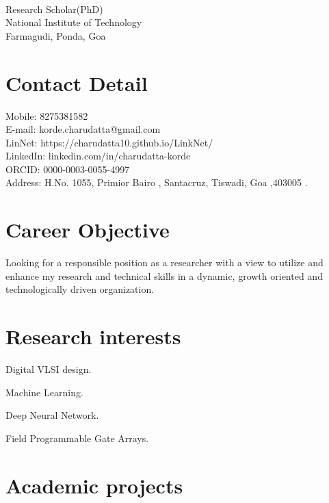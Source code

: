 \documentclass[fontsize=11pt]{tccv}
\begin{document}
\fancypage{\setlength{\fboxsep}{10pt}\fbox}{}
\\
Research Scholar(PhD)\\
National Institute of Technology\\ 
Farmagudi, Ponda, Goa\\ 
\section{Contact Detail}
\begin{flushleft} Mobile: 8275381582\\
E-mail: korde.charudatta@gmail.com\\
LinNet: https://charudatta10.github.io/LinkNet/\\
LinkedIn: linkedin.com/in/charudatta-korde\\
ORCID: 0000-0003-0055-4997\\
Address: H.No. 1055, Primior Bairo ,
Santacruz, Tiswadi, Goa ,403005 .
\end{flushleft}
\vspace{2em}

\section{Career Objective}
Looking for a responsible position as a researcher with a view to utilize and enhance my research and technical skills in a dynamic, growth oriented and technologically driven organization.
\vspace{2em}

\section{Research interests}
\begin{skills}
    \item {Digital VLSI design.}
    \item {Machine Learning.}
    \item {Deep Neural Network.}
    \item {Field Programmable Gate Arrays.}
\end{skills}
\vspace{2em}

\section{Academic projects}
\end{document}

